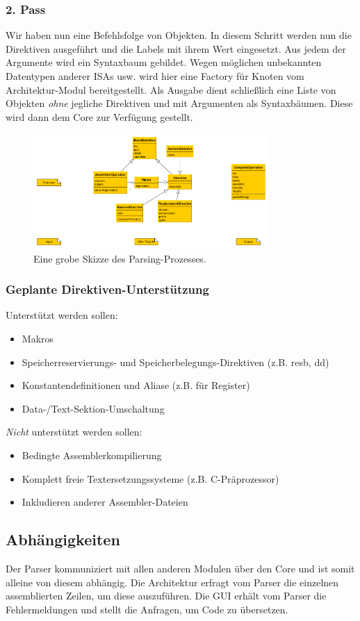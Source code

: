 \documentclass[a4paper]{article}
\begin{document}
\subsubsection{2. Pass}
Wir haben nun eine Befehlsfolge von Objekten. In diesem Schritt werden nun die Direktiven ausgeführt und die Labels mit ihrem Wert eingesetzt.
Aus jedem der Argumente wird ein Syntaxbaum gebildet. Wegen möglichen unbekannten Datentypen anderer ISAs usw. wird hier eine Factory für Knoten vom Architektur-Modul bereitgestellt.
Als Ausgabe dient schließlich eine Liste von Objekten \emph{ohne} jegliche Direktiven und mit Argumenten als Syntaxbäumen. Diese wird dann dem Core zur Verfügung gestellt.
\begin{figure}
\centering
\includegraphics[width=0.8\textwidth]{process.png}
\caption{Eine grobe Skizze des Parsing-Prozesses.}
\end{figure}
\subsubsection{Geplante Direktiven-Unterstützung}
Unterstützt werden sollen:
\begin{itemize}
\item Makros
\item Speicherreservierungs- und Speicherbelegungs-Direktiven (z.B. resb, dd)
\item Konstantendefinitionen und Aliase (z.B. für Register)
\item Data-/Text-Sektion-Umschaltung
\end{itemize}
\emph{Nicht} unterstützt werden sollen:
\begin{itemize}
\item Bedingte Assemblerkompilierung
\item Komplett freie Textersetzungssysteme (z.B. C-Präprozessor)
\item Inkludieren anderer Assembler-Dateien
\end{itemize}
\subsection{Abhängigkeiten}
Der Parser kommuniziert mit allen anderen Modulen über den Core und ist somit alleine von diesem abhängig. 
Die Architektur erfragt vom Parser die einzelnen assemblierten Zeilen, um diese auszuführen.
Die GUI erhält vom Parser die Fehlermeldungen und stellt die Anfragen, um Code zu übersetzen.
\end{document}
